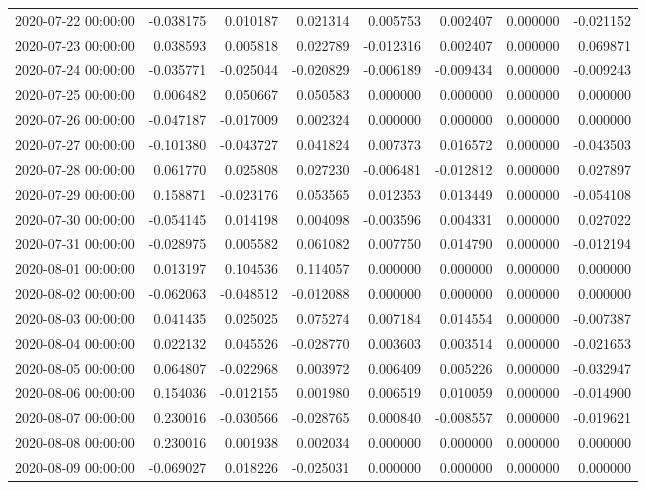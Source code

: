 \begin{tabular}{lrrrrrrr}
2020-07-22 00:00:00 & -0.038175 & 0.010187 & 0.021314 & 0.005753 & 0.002407 & 0.000000 & -0.021152 \\
2020-07-23 00:00:00 & 0.038593 & 0.005818 & 0.022789 & -0.012316 & 0.002407 & 0.000000 & 0.069871 \\
2020-07-24 00:00:00 & -0.035771 & -0.025044 & -0.020829 & -0.006189 & -0.009434 & 0.000000 & -0.009243 \\
2020-07-25 00:00:00 & 0.006482 & 0.050667 & 0.050583 & 0.000000 & 0.000000 & 0.000000 & 0.000000 \\
2020-07-26 00:00:00 & -0.047187 & -0.017009 & 0.002324 & 0.000000 & 0.000000 & 0.000000 & 0.000000 \\
2020-07-27 00:00:00 & -0.101380 & -0.043727 & 0.041824 & 0.007373 & 0.016572 & 0.000000 & -0.043503 \\
2020-07-28 00:00:00 & 0.061770 & 0.025808 & 0.027230 & -0.006481 & -0.012812 & 0.000000 & 0.027897 \\
2020-07-29 00:00:00 & 0.158871 & -0.023176 & 0.053565 & 0.012353 & 0.013449 & 0.000000 & -0.054108 \\
2020-07-30 00:00:00 & -0.054145 & 0.014198 & 0.004098 & -0.003596 & 0.004331 & 0.000000 & 0.027022 \\
2020-07-31 00:00:00 & -0.028975 & 0.005582 & 0.061082 & 0.007750 & 0.014790 & 0.000000 & -0.012194 \\
2020-08-01 00:00:00 & 0.013197 & 0.104536 & 0.114057 & 0.000000 & 0.000000 & 0.000000 & 0.000000 \\
2020-08-02 00:00:00 & -0.062063 & -0.048512 & -0.012088 & 0.000000 & 0.000000 & 0.000000 & 0.000000 \\
2020-08-03 00:00:00 & 0.041435 & 0.025025 & 0.075274 & 0.007184 & 0.014554 & 0.000000 & -0.007387 \\
2020-08-04 00:00:00 & 0.022132 & 0.045526 & -0.028770 & 0.003603 & 0.003514 & 0.000000 & -0.021653 \\
2020-08-05 00:00:00 & 0.064807 & -0.022968 & 0.003972 & 0.006409 & 0.005226 & 0.000000 & -0.032947 \\
2020-08-06 00:00:00 & 0.154036 & -0.012155 & 0.001980 & 0.006519 & 0.010059 & 0.000000 & -0.014900 \\
2020-08-07 00:00:00 & 0.230016 & -0.030566 & -0.028765 & 0.000840 & -0.008557 & 0.000000 & -0.019621 \\
2020-08-08 00:00:00 & 0.230016 & 0.001938 & 0.002034 & 0.000000 & 0.000000 & 0.000000 & 0.000000 \\
2020-08-09 00:00:00 & -0.069027 & 0.018226 & -0.025031 & 0.000000 & 0.000000 & 0.000000 & 0.000000 \\

\end{tabular}
